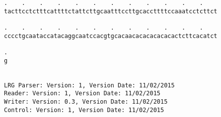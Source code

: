 \documentclass{article}
\begin{document}
\begin{Verbatim}
.    .    .    .    .    .    .    .    .    .    .    .    
tacttcctctttcattttctattcttgcaatttccttgcaccttttccaaatcctcttct
                                                            
.    .    .    .    .    .    .    .    .    .    .    .    
cccctgcaataccatacaggcaatccacgtgcacaacacacacacacactcttcacatct
                                                            
.
g
 
 
LRG Parser: Version: 1, Version Date: 11/02/2015
Reader: Version: 1, Version Date: 11/02/2015
Writer: Version: 0.3, Version Date: 11/02/2015
Control: Version: 1, Version Date: 11/02/2015
\end{Verbatim}
\end{document}
